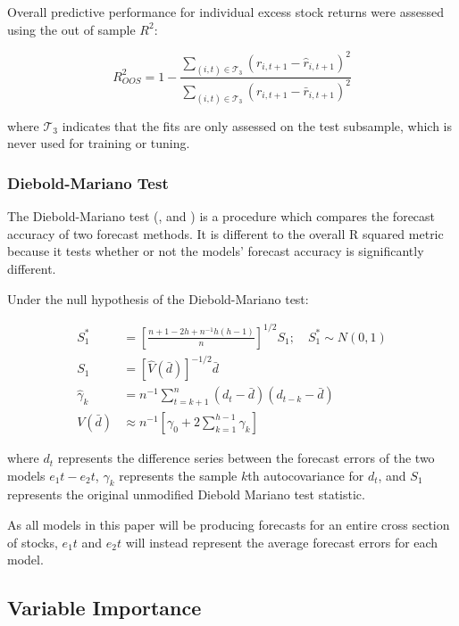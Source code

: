 \documentclass[a4paper, table]{article}
\begin{document}
Overall predictive performance for individual excess stock returns were assessed using the out of sample $R^2$:

\begin{equation}
	R^2_{OOS} = 1 - \frac{\sum_{(i, t)\in\mathcal{T}_3}(r_{i, t+1} - \widehat{r}_{i, t+1})^2}
		{\sum_{(i, t)\in\mathcal{T}_3} \left( r_{i, t+1} - \bar{r}_{i, t+1} \right) ^2}
\end{equation}

where $\mathcal{T}_3$ indicates that the fits are only assessed on the test subsample, which is never used for training or tuning. 

\subsubsection{Diebold-Mariano Test}

The Diebold-Mariano test (\cite{diebold_comparing_2002}, and \cite{harvey_testing_1997}) is a procedure which compares the forecast accuracy of two forecast methods. It is different to the overall R squared metric because it tests whether or not the models' forecast accuracy is significantly different. 

Under the null hypothesis of the Diebold-Mariano test:

\begin{align}
	S_1^* &= \left[ 
		\frac{n + 1 - 2h + n^{-1}h(h-1)}
			{n} 
	\right]^{1/2}S_1 ; \quad S_1^* \sim N(0,1) \\
	S_1 &= \left[ 
		\hat{V}(\bar{d})
	\right] ^{-1/2}\bar{d} \\
	\hat{\gamma}_k &= n^{-1} \sum_{t = k + 1}^{n}(d_t - \bar{d})(d_{t-k} - \bar{d}) \\
	V(\bar{d}) &\approx n^{-1}\left[ 
		\gamma_0 + 2 \sum_{k = 1}^{h - 1}\gamma_k
	\right] 
\end{align}

where $d_t$ represents the difference series between the forecast errors of the two models $e_1t - e_2t$, $\hat{\gamma}_k$ represents the sample $k$th autocovariance for $d_t$, and $S_1$ represents the original unmodified Diebold Mariano test statistic.

As all models in this paper will be producing forecasts for an entire cross section of stocks, $e_1t$ and $e_2t$ will instead represent the average forecast errors for each model.

\subsection{Variable Importance}
\end{document}
